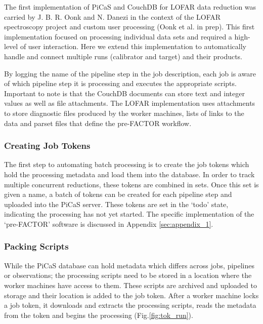 The first implementation of PiCaS and CouchDB for LOFAR data reduction was carried by J. B. R. Oonk and N. Danezi in the context of the LOFAR spectroscopy project and custom user processing (Oonk et al. in prep). This first implementation focused on processing individual data sets and required a high-level of user interaction. Here we extend this implementation to automatically handle and connect multiple runs (calibrator and target) and their products.


By logging the name of the pipeline step in the job description, each job is aware of which pipeline step it is processing and executes the appropriate scripts. Important to note is that the CouchDB documents can store text and integer values as well as file attachments. The LOFAR implementation uses attachments to store diagnostic files produced by the worker machines, lists of links to the data and parset files that define the pre-FACTOR workflow. 

\subsubsection{Creating Job Tokens}\label{sec:create_tokens}

The first step to automating batch processing is to create the job tokens which hold the processing metadata and load them into the database. In order to track multiple concurrent reductions, these tokens are combined in sets. Once this set is given a name, a batch of tokens can be created for each pipeline step and uploaded into the PiCaS server. These tokens are set in the `todo' state, indicating the processing has not yet started. The specific implementation of the `pre-FACTOR' software is discussed in Appendix \ref{sec:appendix_1}.


\subsubsection{Packing Scripts}\label{sect:scripts}

While the PiCaS database can hold metadata which differs across jobs, pipelines or observations; the processing scripts need to be stored in a location where the worker machines have access to them. These scripts are archived and uploaded to storage and their location is added to the job token. After a worker machine locks a job token, it downloads and extracts the processing scripts, reads the metadata from the token and begins the processing (Fig.\ref{fig:tok_run}).

